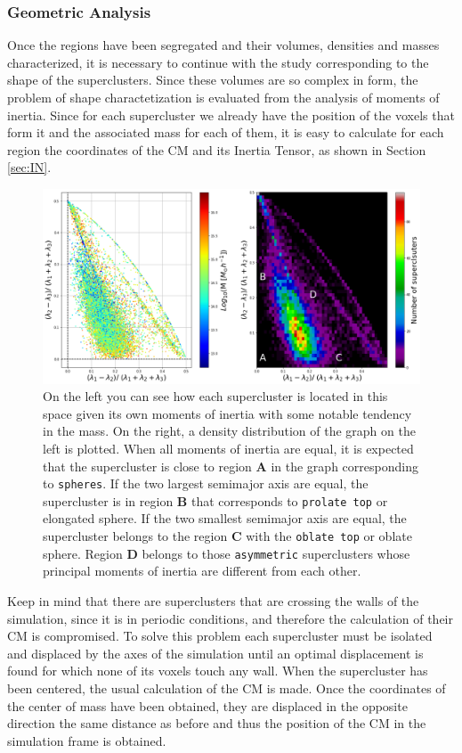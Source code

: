 \subsubsection{Geometric Analysis}
Once the regions have been segregated and their volumes, densities and masses characterized, it is necessary to continue with the study corresponding to the shape of the superclusters. Since these volumes are so complex in form, the problem of shape charactetization is evaluated from the analysis of moments of inertia. Since for each supercluster we already have the position of the voxels that form it and the associated mass for each of them, it is easy to calculate for each region the coordinates of the CM and its Inertia Tensor, as shown in Section \ref{sec:IN}.

\begin{figure}
    \centering
    \includegraphics[width=480pt]{shapeStats_1M.png}
    \caption{On the left you can see how each supercluster is located in this space given its own moments of inertia with some notable tendency in the mass. On the right, a density distribution of the graph on the left is plotted. When all moments of inertia are equal, it is expected that the supercluster is close to region \textbf{A} in the graph corresponding to \texttt{spheres}. If the two largest semimajor axis are equal, the supercluster is in region \textbf{B} that corresponds to \texttt{prolate top} or elongated sphere. If the two smallest semimajor axis are equal, the supercluster belongs to the region \textbf{C} with the \texttt{oblate top} or oblate sphere. Region \textbf{D} belongs to those \texttt{asymmetric} superclusters whose principal moments of inertia are different from each other.}
    \label{fig:INERTIA}
\end{figure}

Keep in mind that there are superclusters that are crossing the walls of the simulation, since it is in periodic conditions, and therefore the calculation of their CM is compromised. To solve this problem each supercluster must be isolated and displaced by the axes of the simulation until an optimal displacement is found for which none of its voxels touch any wall. When the supercluster has been centered, the usual calculation of the CM is made. Once the coordinates of the center of mass have been obtained, they are displaced in the opposite direction the same distance as before and thus the position of the CM in the simulation frame is obtained.

